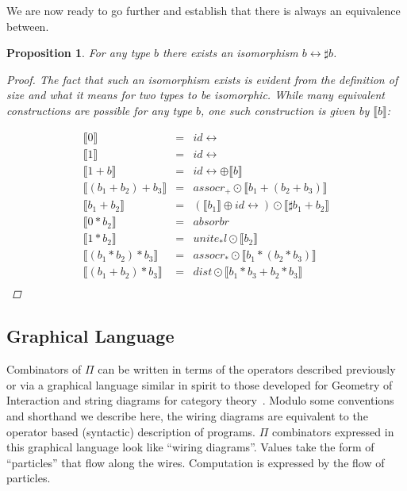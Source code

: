 \documentclass{article}
\newtheorem{proposition}[theorem]{Proposition}
\newcommand{\assocrp}{\ensuremath{\mathit{assocr}_+}}
\newcommand{\identlt}{\ensuremath{\mathit{unite}_*\mathit{l}}}
\newcommand{\assocrt}{\ensuremath{\mathit{assocr}_*}}
\newcommand{\absorbr}{\ensuremath{\mathit{absorbr}}}
\newcommand{\dist}{\ensuremath{\mathit{dist}}}
\newcommand{\idc}{\mathit{id}\!\!\leftrightarrow}
\newcommand{\sem}[1]{\ensuremath{\llbracket{#1}\rrbracket}}
\begin{document}
We are now ready to go further and establish
that there is always an equivalence between.

\begin{proposition}
  For any type \ensuremath{b} there exists an isomorphism \ensuremath{b \leftrightarrow \sharp b}.
  \begin{proof}
    The fact that such an isomorphism exists is evident from the
    definition of size and what it means for two types to be
    isomorphic. While many equivalent constructions are possible
    for any type \ensuremath{b}, one such construction is given by 
    \sem{b}:

\[\begin{array}{rclr}
 \sem{0} & = & \idc \\
 \sem{1} & = & \idc \\
 \sem{1+b} & = & \idc \oplus \sem{b} \\
 \sem{(b_1+b_2)+b_3} & = & \assocrp \odot \sem{b_1 + (b_2 + b_3)} \\
 \sem{b_1 + b_2} & = & (\sem{b_1} \oplus \idc) \odot \sem{ \sharp b_1 + b_2 } \\
 \sem{0 * b_2} & = & \absorbr \\
 \sem{1 * b_2} & = & \identlt \odot \sem{b_2} \\
 \sem{(b_1 * b_2) * b_3} & = & \assocrt \odot \sem{b_1 * (b_2 * b_3)} \\
 \sem{(b_1+b_2) * b_3} & = & \dist \odot \sem{b_1 * b_3+b_2 * b_3} \\
 \end{array}\]

  \end{proof}
\end{proposition}

\subsection{Graphical Language}


Combinators of \ensuremath{\Pi } can be written in terms of the
operators described previously or via a graphical language similar in
spirit to those developed for Geometry of Interaction
\cite{DBLP:conf/popl/Mackie95} and string diagrams for category
theory~\cite{BLUTE1996229,selinger-graphical}. Modulo some conventions
and shorthand we describe here, the wiring diagrams are equivalent to
the operator based (syntactic) description of programs.
\ensuremath{\Pi } combinators expressed in this graphical language
look like ``wiring diagrams''. Values take the form of ``particles''
that flow along the wires. Computation is expressed by the flow of
particles.
\end{document}
